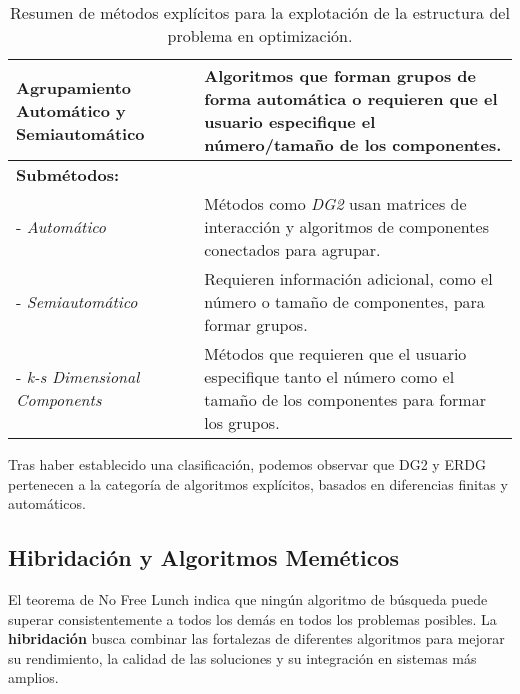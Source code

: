 \begin{table}[H]
{\begin{tabular}{|l|p{12cm}|}
\textbf{Agrupamiento Automático y Semiautomático} & Algoritmos que forman grupos de forma automática o requieren que el usuario especifique el número/tamaño de los componentes. \\ \hline
\multicolumn{2}{|l|}{\textbf{Submétodos:}} \\ \hline
- \textit{Automático} & Métodos como \textit{DG2} usan matrices de interacción y algoritmos de componentes conectados para agrupar. \\ \hline
- \textit{Semiautomático} & Requieren información adicional, como el número o tamaño de componentes, para formar grupos. \\ \hline
- \textit{k-s Dimensional Components} & Métodos que requieren que el usuario especifique tanto el número como el tamaño de los componentes para formar los grupos. \\ \hline
\end{tabular}%
}
\caption{Resumen de métodos explícitos para la explotación de la estructura del problema en optimización.}
\label{tab:explicit_methods}
\end{table}

Tras haber establecido una clasificación, podemos observar que DG2 y ERDG pertenecen a la categoría de algoritmos explícitos, basados en diferencias finitas y automáticos.

\subsection{Hibridación y Algoritmos Meméticos}

El teorema de No Free Lunch \cite{no_free_lunch} indica que ningún algoritmo de búsqueda puede superar consistentemente a todos los demás en todos los problemas posibles. La \textbf{hibridación} busca combinar las fortalezas de diferentes algoritmos para mejorar su rendimiento, la calidad de las soluciones y su integración en sistemas más amplios.

